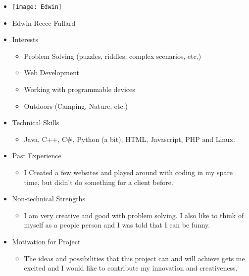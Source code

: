 
\begin{itemize}
	\item[] \texttt{[image: Edwin]}
	\item[] Edwin Reece Fullard
	\item Interests
	\begin{itemize}
		\item Problem Solving (puzzles, riddles, complex scenarios, etc.)
		\item Web Development
		\item Working with programmable devices
		\item Outdoors (Camping, Nature, etc.)
	\end{itemize}
	\item Technical Skills
	\begin{itemize}
		\item[] Java, C++, C\#, Python (a bit), HTML, Javascript, PHP and Linux.
	\end{itemize}
	\item Past Experience
	\begin{itemize}
		\item[] I Created a few websites and played around with coding in my spare time, but didn't do something for a client before.
	\end{itemize}
	\item Non-technical Strengths
	\begin{itemize}
		\item[] I am very creative and good with problem solving. I also like to think of myself as a people person and I was told that I can be funny.
	\end{itemize}
	\item Motivation for Project
	\begin{itemize}
		\item[] The ideas and possibilities that this project can and will achieve gets me excited and I would like to contribute my innovation and creativeness.
	\end{itemize}
\end{itemize}